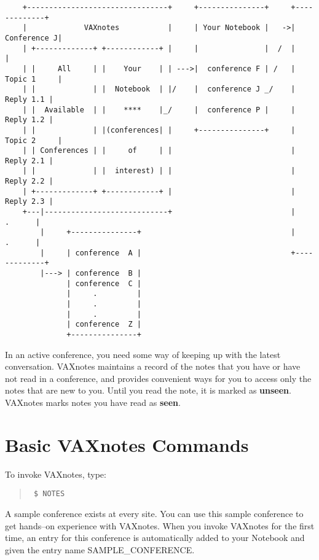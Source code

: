 \begin{verbatim}



    +--------------------------------+     +---------------+     +-------------+
    |             VAXnotes           |     | Your Notebook |   ->| Conference J|
    | +-------------+ +------------+ |     |               |  /  |             |
    | |     All     | |    Your    | | --->|  conference F | /   | Topic 1     |
    | |             | |  Notebook  | |/    |  conference J _/    |   Reply 1.1 |
    | |  Available  | |    ****    |_/     |  conference P |     |   Reply 1.2 |
    | |             | |(conferences| |     +---------------+     | Topic 2     |
    | | Conferences | |     of     | |                           |   Reply 2.1 |
    | |             | |  interest) | |                           |   Reply 2.2 |
    | +-------------+ +------------+ |                           |   Reply 2.3 |
    +---|----------------------------+                           |      .      |
        |     +---------------+                                  |      .      |
        |     | conference  A |                                  +-------------+
        |---> | conference  B |
              | conference  C |
              |     .         |
              |     .         |
              |     .         |
              | conference  Z |
              +---------------+

\end{verbatim}

In an active conference, you need some way of keeping up with the latest
conversation. VAXnotes maintains a record of the notes that you have or
have not read in a conference, and provides convenient ways for you to
access only the notes that are new to you. Until you read the note, it
is marked as {\bf unseen}. VAXnotes marks notes you have read as {\bf seen}.

\section {Basic VAXnotes Commands}

To invoke VAXnotes, type:

\begin{quote}\tt
\$ NOTES
\end{quote}

A sample conference exists at every site. You can use this sample
conference to get hands--on experience with VAXnotes. When you invoke
VAXnotes for the first time, an entry for this conference is automatically
added to your Notebook and given the entry name SAMPLE\_CONFERENCE.

